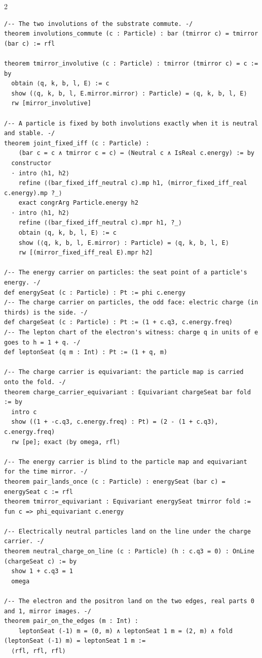 \documentclass[10pt]{article}
\begin{document}
\begin{multicols}{2}
\begin{Verbatim}[fontsize=\fontsize{5.9}{6.8}\selectfont,breaklines,breakanywhere,breaksymbolleft={}]
/-- The two involutions of the substrate commute. -/
theorem involutions_commute (c : Particle) : bar (tmirror c) = tmirror (bar c) := rfl

theorem tmirror_involutive (c : Particle) : tmirror (tmirror c) = c := by
  obtain ⟨q, k, b, l, E⟩ := c
  show (⟨q, k, b, l, E.mirror.mirror⟩ : Particle) = ⟨q, k, b, l, E⟩
  rw [mirror_involutive]

/-- A particle is fixed by both involutions exactly when it is neutral and stable. -/
theorem joint_fixed_iff (c : Particle) :
    (bar c = c ∧ tmirror c = c) ↔ (Neutral c ∧ IsReal c.energy) := by
  constructor
  · intro ⟨h1, h2⟩
    refine ⟨(bar_fixed_iff_neutral c).mp h1, (mirror_fixed_iff_real c.energy).mp ?_⟩
    exact congrArg Particle.energy h2
  · intro ⟨h1, h2⟩
    refine ⟨(bar_fixed_iff_neutral c).mpr h1, ?_⟩
    obtain ⟨q, k, b, l, E⟩ := c
    show (⟨q, k, b, l, E.mirror⟩ : Particle) = ⟨q, k, b, l, E⟩
    rw [(mirror_fixed_iff_real E).mpr h2]

/-- The energy carrier on particles: the seat point of a particle's energy. -/
def energySeat (c : Particle) : Pt := phi c.energy
/-- The charge carrier on particles, the odd face: electric charge (in thirds) is the side. -/
def chargeSeat (c : Particle) : Pt := (1 + c.q3, c.energy.freq)
/-- The lepton chart of the electron's witness: charge q in units of e goes to h = 1 + q. -/
def leptonSeat (q m : Int) : Pt := (1 + q, m)

/-- The charge carrier is equivariant: the particle map is carried onto the fold. -/
theorem charge_carrier_equivariant : Equivariant chargeSeat bar fold := by
  intro c
  show ((1 + -c.q3, c.energy.freq) : Pt) = (2 - (1 + c.q3), c.energy.freq)
  rw [pe]; exact ⟨by omega, rfl⟩

/-- The energy carrier is blind to the particle map and equivariant for the time mirror. -/
theorem pair_lands_once (c : Particle) : energySeat (bar c) = energySeat c := rfl
theorem tmirror_equivariant : Equivariant energySeat tmirror fold := fun c => phi_equivariant c.energy

/-- Electrically neutral particles land on the line under the charge carrier. -/
theorem neutral_charge_on_line (c : Particle) (h : c.q3 = 0) : OnLine (chargeSeat c) := by
  show 1 + c.q3 = 1
  omega

/-- The electron and the positron land on the two edges, real parts 0 and 1, mirror images. -/
theorem pair_on_the_edges (m : Int) :
    leptonSeat (-1) m = (0, m) ∧ leptonSeat 1 m = (2, m) ∧ fold (leptonSeat (-1) m) = leptonSeat 1 m :=
  ⟨rfl, rfl, rfl⟩


\end{Verbatim}
\end{multicols}
\end{document}
